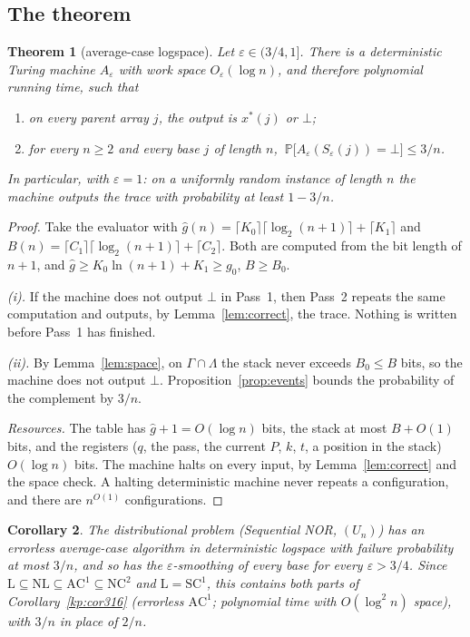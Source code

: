 \documentclass[11pt]{amsart}
\newtheorem{theorem}{Theorem}
\newtheorem{corollary}[theorem]{Corollary}
\theoremstyle{definition}
\theoremstyle{remark}
\newcommand{\eps}{\varepsilon}
\newcommand{\PP}{\mathbb{P}}
\newcommand{\ghat}{\hat g}
\begin{document}
\subsection{The theorem}

\begin{theorem}[average-case logspace]\label{thm:logspace}
Let $\eps\in(3/4,1]$. There is a deterministic Turing machine $A_\eps$ with work space
$O_\eps(\log n)$, and therefore polynomial running time, such that
\begin{enumerate}[label=(\roman*),leftmargin=2.4em]
\item on every parent array $j$, the output is $x^*(j)$ or $\bot$;
\item for every $n\ge2$ and every base $j$ of length $n$,
$\ \PP\bigl[A_\eps(S_\eps(j))=\bot\bigr]\le 3/n$.
\end{enumerate}
In particular, with $\eps=1$: on a uniformly random instance of length $n$ the machine outputs
the trace with probability at least $1-3/n$.
\end{theorem}

\begin{proof}
Take the evaluator with
$\ghat(n)=\lceil K_0\rceil\lceil\log_2(n+1)\rceil+\lceil K_1\rceil$ and
$B(n)=\lceil C_1\rceil\lceil\log_2(n+1)\rceil+\lceil C_2\rceil$. Both are computed from the bit
length of $n+1$, and $\ghat\ge K_0\ln(n+1)+K_1\ge g_0$, $B\ge B_0$.

\emph{(i).} If the machine does not output $\bot$ in Pass~1, then Pass~2 repeats the same
computation and outputs, by Lemma~\ref{lem:correct}, the trace. Nothing is written before Pass~1
has finished.

\emph{(ii).} By Lemma~\ref{lem:space}, on $\Gamma\cap\Lambda$ the stack never exceeds $B_0\le B$
bits, so the machine does not output $\bot$. Proposition~\ref{prop:events} bounds the
probability of the complement by $3/n$.

\emph{Resources.} The table has $\ghat+1=O(\log n)$ bits, the stack at most $B+O(1)$ bits, and
the registers ($q$, the pass, the current $P$, $k$, $t$, a position in the stack) $O(\log n)$
bits. The machine halts on every input, by Lemma~\ref{lem:correct} and the space check. A halting
deterministic machine never repeats a configuration, and there are $n^{O(1)}$ configurations.
\end{proof}

\begin{corollary}\label{cor:classes}
The distributional problem (Sequential NOR, $(U_n)$) has an errorless average-case algorithm in
deterministic logspace with failure probability at most $3/n$, and so has the $\eps$-smoothing of
every base for every $\eps>3/4$. Since
$\mathrm{L}\subseteq\mathrm{NL}\subseteq\mathrm{AC}^1\subseteq\mathrm{NC}^2$ and
$\mathrm{L}=\mathrm{SC}^1$, this contains both parts of Corollary~\ref{kp:cor316} (errorless
$\mathrm{AC}^1$; polynomial time with $O(\log^2n)$ space), with $3/n$ in place of $2/n$.
\end{corollary}
\end{document}
